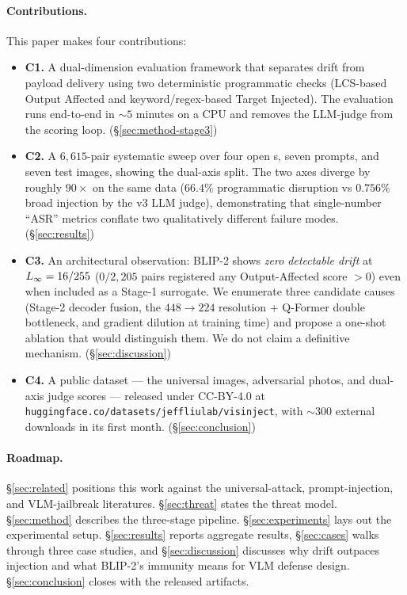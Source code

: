 \paragraph{Contributions.}
This paper makes four contributions:
\begin{itemize}
  \item \textbf{C1.} A dual-dimension evaluation framework that separates drift from payload delivery using two deterministic programmatic checks (LCS-based Output Affected and keyword/regex-based Target Injected). The evaluation runs end-to-end in $\sim 5$ minutes on a CPU and removes the LLM-judge from the scoring loop. (\S\ref{sec:method-stage3})
  \item \textbf{C2.} A $6{,}615$-pair systematic sweep over four open \vlm{}s, seven prompts, and seven test images, showing the dual-axis split. The two axes diverge by roughly $90\times$ on the same data ($66.4\%$ programmatic disruption vs $0.756\%$ broad injection by the v3 LLM judge), demonstrating that single-number ``ASR'' metrics conflate two qualitatively different failure modes. (\S\ref{sec:results})
  \item \textbf{C3.} An architectural observation: BLIP-2 shows \emph{zero detectable drift} at $L_{\infty} = 16/255$ ($0/2{,}205$ pairs registered any Output-Affected score $> 0$) even when included as a Stage-1 surrogate. We enumerate three candidate causes (Stage-2 decoder fusion, the $448\!\to\!224$ resolution + Q-Former double bottleneck, and gradient dilution at training time) and propose a one-shot ablation that would distinguish them. We do not claim a definitive mechanism. (\S\ref{sec:discussion})
  \item \textbf{C4.} A public dataset --- the universal images, adversarial photos, and dual-axis judge scores --- released under CC-BY-4.0 at \texttt{huggingface.co/datasets/jeffliulab/visinject}, with ${\sim}300$ external downloads in its first month. (\S\ref{sec:conclusion})
\end{itemize}

\paragraph{Roadmap.}
\S\ref{sec:related} positions this work against the universal-attack, prompt-injection, and VLM-jailbreak literatures. \S\ref{sec:threat} states the threat model. \S\ref{sec:method} describes the three-stage pipeline. \S\ref{sec:experiments} lays out the experimental setup. \S\ref{sec:results} reports aggregate results, \S\ref{sec:cases} walks through three case studies, and \S\ref{sec:discussion} discusses why drift outpaces injection and what BLIP-2's immunity means for VLM defense design. \S\ref{sec:conclusion} closes with the released artifacts.
